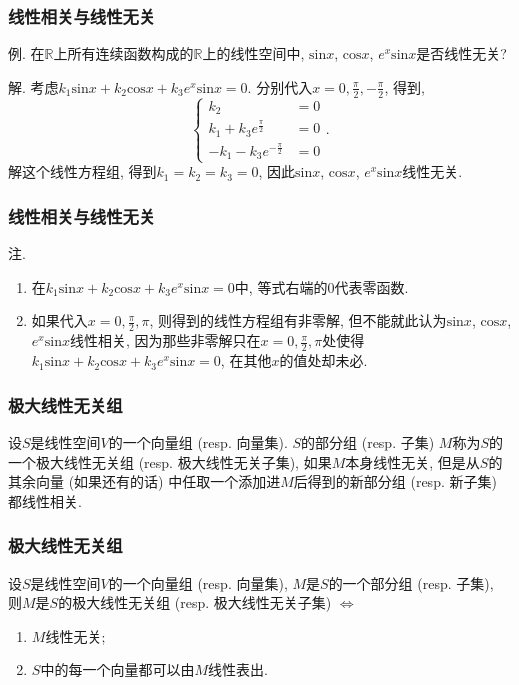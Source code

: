 \documentclass[CJK]{beamer}
\begin{document}
\begin{frame}
	\frametitle{线性相关与线性无关} \pause
	例. 在$\mathbb{R}$上所有连续函数构成的$\mathbb{R}$上的线性空间中, $\mathrm{sin}x$, $\mathrm{cos}x$, $e^{x}\mathrm{sin}x$是否线性无关? \pause
	
	\vspace{0.5cm}
	
	解. 考虑$k_{1}\mathrm{sin}x+k_{2}\mathrm{cos}x+k_{3}e^{x}\mathrm{sin}x=0$. \pause 分别代入$x=0, \frac{\pi}{2}, -\frac{\pi}{2}$, 得到,
	\[\left\{\begin{aligned}
		k_{2}&=0\\
		k_{1}+k_{3}e^{\frac{\pi}{2}}&=0\\
		-k_{1}-k_{3}e^{-\frac{\pi}{2}}&=0
	\end{aligned}\right..\] \pause
解这个线性方程组, 得到$k_{1}=k_{2}=k_{3}=0$, 因此$\mathrm{sin}x$, $\mathrm{cos}x$, $e^{x}\mathrm{sin}x$线性无关.
\end{frame}

\begin{frame}
	\frametitle{线性相关与线性无关} \pause
注. \begin{enumerate}[1]
	\item 在$k_{1}\mathrm{sin}x+k_{2}\mathrm{cos}x+k_{3}e^{x}\mathrm{sin}x=0$中, 等式右端的$0$代表零函数. \pause
	\item 如果代入$x=0, \frac{\pi}{2}, \pi$, 则得到的线性方程组有非零解, 但不能就此认为$\mathrm{sin}x$, $\mathrm{cos}x$, $e^{x}\mathrm{sin}x$线性相关, 因为那些非零解只在$x=0, \frac{\pi}{2}, \pi$处使得$k_{1}\mathrm{sin}x+k_{2}\mathrm{cos}x+k_{3}e^{x}\mathrm{sin}x=0$, 在其他$x$的值处却未必.
\end{enumerate}
\end{frame}

\begin{frame}
	\frametitle{极大线性无关组} \pause
	\begin{definition}
		设$S$是线性空间$V$的一个向量组 (resp. 向量集). $S$的部分组 (resp. 子集) $M$称为$S$的一个极大线性无关组 (resp. 极大线性无关子集), 如果$M$本身线性无关, 但是从$S$的其余向量 (如果还有的话) 中任取一个添加进$M$后得到的新部分组 (resp. 新子集) 都线性相关.
	\end{definition}
\end{frame}
	
\begin{frame}
		\frametitle{极大线性无关组} \pause
		\begin{theorem}
			设$S$是线性空间$V$的一个向量组 (resp. 向量集), $M$是$S$的一个部分组 (resp. 子集), 则$M$是$S$的极大线性无关组 (resp. 极大线性无关子集) $\Longleftrightarrow$\begin{enumerate}[(1)]
				\item $M$线性无关;
				\item $S$中的每一个向量都可以由$M$线性表出.
			\end{enumerate}
		\end{theorem}
\end{frame}
\end{document}
